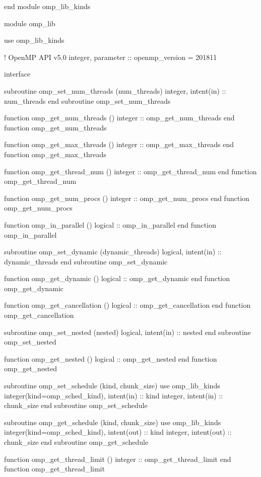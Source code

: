 {\begin{ompfFunction}
end module omp_lib_kinds

module omp_lib

  use omp_lib_kinds

!                               OpenMP API v5.0
  integer, parameter :: openmp_version = 201811

  interface

    subroutine omp_set_num_threads (num_threads)
      integer, intent(in) :: num_threads
    end subroutine omp_set_num_threads

    function omp_get_num_threads ()
      integer :: omp_get_num_threads
    end function omp_get_num_threads

    function omp_get_max_threads ()
      integer :: omp_get_max_threads
    end function omp_get_max_threads

    function omp_get_thread_num ()
      integer :: omp_get_thread_num
    end function omp_get_thread_num

    function omp_get_num_procs ()
      integer :: omp_get_num_procs
    end function omp_get_num_procs

    function omp_in_parallel ()
      logical :: omp_in_parallel
    end function omp_in_parallel

    subroutine omp_set_dynamic (dynamic_threads)
      logical, intent(in) :: dynamic_threads
    end subroutine omp_set_dynamic

    function omp_get_dynamic ()
      logical :: omp_get_dynamic
    end function omp_get_dynamic

    function omp_get_cancellation ()
      logical :: omp_get_cancellation
    end function omp_get_cancellation

    subroutine omp_set_nested (nested)
      logical, intent(in) :: nested
    end subroutine omp_set_nested

    function omp_get_nested ()
      logical :: omp_get_nested
    end function omp_get_nested

    subroutine omp_set_schedule (kind, chunk_size)
      use omp_lib_kinds
      integer(kind=omp_sched_kind), intent(in) :: kind
      integer, intent(in) :: chunk_size
    end subroutine omp_set_schedule

    subroutine omp_get_schedule (kind, chunk_size)
      use omp_lib_kinds
      integer(kind=omp_sched_kind), intent(out) :: kind
      integer, intent(out) :: chunk_size
    end subroutine omp_get_schedule

    function omp_get_thread_limit ()
      integer :: omp_get_thread_limit
    end function omp_get_thread_limit


\end{ompfFunction}}
